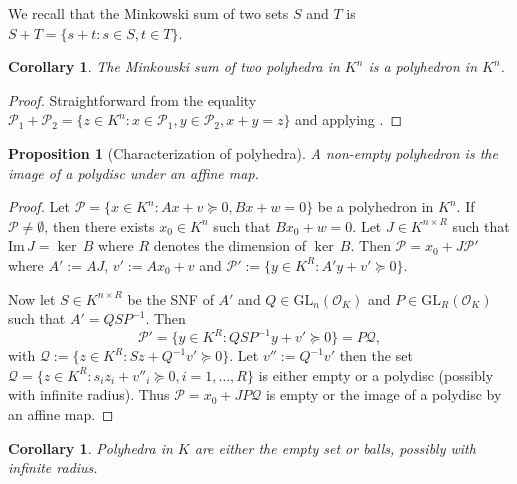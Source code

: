 \documentclass{elsarticle}
\theoremstyle{plain}
\newtheorem{proposition}[theorem]{Proposition}
\newtheorem{corollary}[theorem]{Corollary}
\theoremstyle{definition}
\newcommand{\PP}{\mathcal{P}}
\newcommand{\GL}{\mathrm{GL}}
\begin{document}
We recall that the Minkowski sum of two sets $S$ and $T$ is $S+T = \{s+t : s \in S, t \in T\}$.

\begin{corollary}
The Minkowski sum of two polyhedra in $K^n$ is a polyhedron in $K^n$.
\end{corollary}
\begin{proof}
  Straightforward from the equality
  $\PP_1 + \PP_2 = \{z \in K^n : x \in \PP_1, y \in \PP_2, x+y=z\}$
  and applying .
\end{proof}

\begin{proposition}[Characterization of polyhedra] \label{prop:carac}
    A non-empty polyhedron is the image of a polydisc under an affine map.
\end{proposition}
\begin{proof}
    Let $\PP = \{x \in K^n : Ax+v \succeq 0, Bx + w = 0\}$ be a polyhedron in $K^n$.
    If $\PP \neq \emptyset$, then there exists $x_0 \in K^n$ such that $Bx_0+w=0$.
    Let $J \in K^{n \times R}$ such that $\mathrm{Im}\,J = \ker\,B$ where $R$ denotes
    the dimension of $\ker\,B$. Then $\PP = x_0 + J\PP'$ where
    $A' := AJ$, $v' := Ax_0 + v$ and
    $\PP' := \{y \in K^R : A'y + v' \succeq 0 \}$.

    Now let $S \in K^{n\times R}$ be the SNF of $A'$ and $Q \in \GL_n\left(\mathcal{O}_K\right)$
    and $P \in \GL_R(\mathcal{O}_K)$ such that $A'= Q S P^{-1}$.
    Then
    $$
    \PP' = \{y \in K^R : QSP^{-1}y + v' \succeq 0\} = P \mathcal{Q},
    $$
    with $\mathcal{Q} := \{z \in K^R : Sz + Q^{-1}v' \succeq 0 \}$.
    Let $v'' := Q^{-1}v'$ then the set
    $\mathcal{Q} = \{z \in K^R : s_i z_i + v''_i \succeq 0, i= 1,\ldots,R\}$
    is either empty or a polydisc (possibly with infinite radius).
    Thus $\PP = x_0+JP\mathcal{Q}$ is empty or the image of a polydisc by an affine map.
\end{proof}

\begin{corollary} \label{cor:caracdim1}
   Polyhedra in $K$ are either the empty set or balls, possibly with infinite radius.
\end{corollary}
\end{document}

